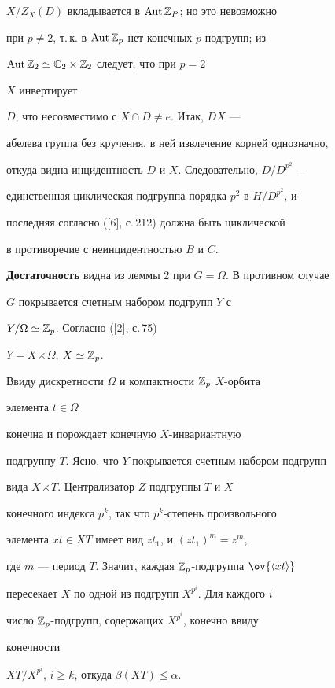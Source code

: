 $X/Z_X(D)$ вкладывается в $\operatorname{Aut}\Bbb Z_P$; но это невозможно  


при $p\ne 2$, т.\,к. в $\operatorname{Aut}\Bbb Z_p$ нет конечных $p$-подгрупп; из  


$\operatorname{Aut}\Bbb Z_2\simeq\Bbb C_2\times\Bbb Z_2$ следует, что при $p=2$\; 


$X$ инвертирует 


$D$, что несовместимо с $X\cap D\ne e$. Итак, $DX$ --- 


абелева группа без кручения, в ней извлечение корней однозначно, 


откуда видна инцидентность $D$ и $X$. Следовательно, $D/D^{p^2}$ --- 


единственная циклическая подгруппа порядка $p^2$ в $H/D^{p^2}$, и 


последняя согласно ([6], с.\,212) должна быть циклической 


в противоречие с неинцидентностью $B$ и $C$. 


 


{\bf Достаточность} видна из леммы 2 при $G=\Omega$. В противном случае 


$G$ покрывается счетным набором подгрупп $Y$ с 


$Y/\Omega\simeq\Bbb Z_p$. Согласно ([2], с.\,75) 


$Y=X\rightthreetimes\Omega$, $X\simeq\Bbb Z_p$. 


Ввиду дискретности $\Omega$ и компактности $\Bbb Z_p$\; $X$-орбита 


элемента $t\in\Omega$ 


конечна и порождает конечную $X$-инвариантную 


подгруппу $T$. Ясно, что $Y$ покрывается счетным набором подгрупп 


вида $X\rightthreetimes T$. Централизатор $Z$ подгруппы $T$ и $X$


конечного индекса $p^k$, так что $p^k$-степень произвольного  


элемента $xt\in XT$ имеет вид $zt_1$, и $(zt_1)^m=z^m$, 


где $m$ --- период $T$. Значит, каждая $\Bbb Z_p$-подгруппа $\ov{\la 


xt\ra}$ 


пересекает $X$ по одной из подгрупп $X^{p^i}$. Для каждого $i$ 


число $\Bbb Z_p$-подгрупп, содержащих $X^{p^i}$, конечно ввиду 


конечности  


$XT/X^{p^i}$, $i\ge k$, откуда $\beta(XT)\le\alpha$. 


